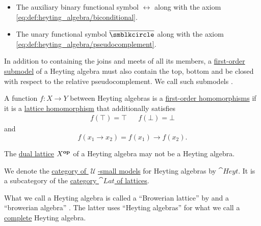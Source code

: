 \begin{definition}
\begin{thmenum}[resume=def:heyting_algebra]
\begin{itemize}
      \item The auxiliary binary functional symbol \( \leftrightarrow \) along with the axiom \eqref{eq:def:heyting_algebra/biconditional}.

      \item The unary functional symbol \( {\oline {\anon}} \) along with the axiom \eqref{eq:def:heyting_algebra/pseudocomplement}.
    \end{itemize}

     In addition to containing the joins and meets of all its members, a \hyperref[def:first_order_submodel]{first-order submodel} of a Heyting algebra must also contain the top, bottom and be closed with respect to the relative pseudocomplement. We call such submodels .

     A function \( f: X \to Y \) between Heyting algebras is a \hyperref[def:first_order_homomorphism]{first-order homomorphisms} if it is a \hyperref[def:lattice/homomorphism]{lattice homomorphism} that additionally satisfies
    \begin{align}\label{eq:def:heyting_algebra/homomorphism/top_bottom}
      f(\top) = \top
      &&
      f(\bot) = \bot
    \end{align}
    and
    \begin{equation}\label{eq:def:heyting_algebra/homomorphism/operation}
      f(x_1 \rightarrow x_2) = f(x_1) \rightarrow f(x_2).
    \end{equation}

     The \hyperref[def:lattice/opposite]{dual lattice} \( X^\oppos \) of a Heyting algebra may not be a Heyting algebra.

     We denote the \hyperref[def:category_of_small_first_order_models]{category of \( \mscrU \)-small models} for Heyting algebras by \( \cat{Heyt} \). It is a subcategory of the \hyperref[def:lattice/category]{category \( \cat{Lat} \) of lattices}.
  \end{thmenum}
\end{definition}
\begin{comments}
  \item What we call a Heyting algebra is called a \enquote{Browerian lattice} by  and a \enquote{browerian algebra} . The latter uses \enquote{Heyting algebras} for what we call a \hyperref[def:complete_lattice]{complete} Heyting algebra.
\end{comments}
